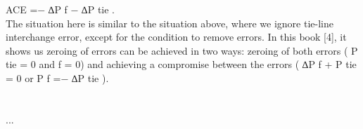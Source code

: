 \documentclass{report}
\begin{document}
ACE =− ∆P f − ∆P tie .\\

The situation here is similar to the situation above, where we ignore tie-line interchange error, except for the condition to remove errors. In this book [4], it shows us zeroing of errors can be achieved in two ways: zeroing of both errors ( P tie = 0 and f = 0) and achieving a compromise between the errors ( ∆P f + P tie = 0 or P f =− ∆P tie ).\\











\appendix
\chapter{}
...
%
%
\end{document}
